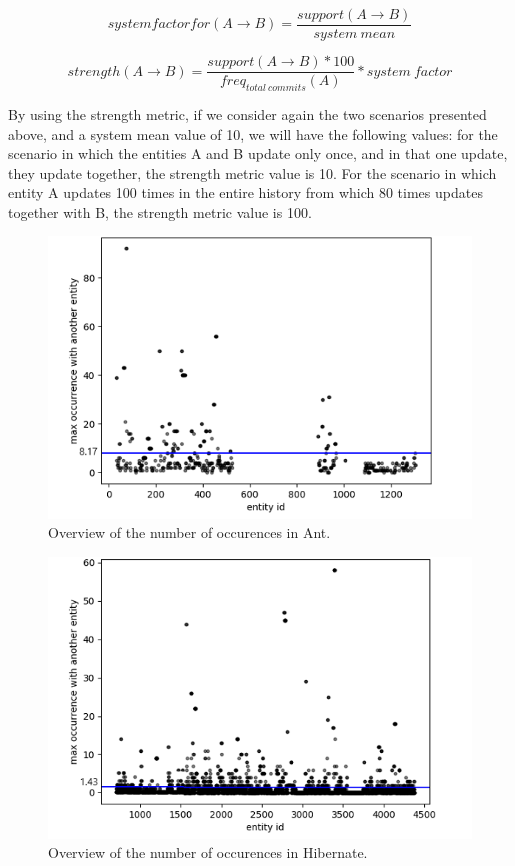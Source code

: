 \documentclass[runningheads]{comsis2}
\begin{document}
\begin{equation}
 system factor for (A \rightarrow B) =\frac{support (A \rightarrow B) }{system\ mean}
\end{equation}

\begin{equation}
 strength (A \rightarrow B) =\frac{support (A \rightarrow B) * 100}{freq_{total\ commits}(A)} * system\ factor
\end{equation}

By using the strength metric, if we consider again the two scenarios presented above, and a system mean value of 10, we will have the following values: for the scenario in which the entities A and B update only once, and in that one update, they update together, the strength metric value is 10. For the scenario in which entity A updates 100 times in the entire history from which 80 times updates together with B, the strength metric value is 100.  

\begin{figure}
\centering
\includegraphics[scale=0.8]{fig_ant_maxOcc.png}
\caption{Overview of the number of occurences in Ant. }
\label{fig:strength_overview_ant}
\centering
\end{figure}

\vspace{-1em}
\begin{figure}
\centering
\includegraphics[scale=0.8]{fig_hibernate_maxOcc.png}
\caption{Overview of the number of occurences in Hibernate. }
\label{fig:strength_overview_hibernate}
\centering
\end{figure}
\end{document}

